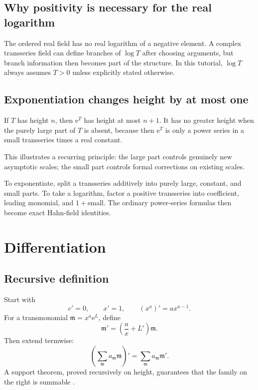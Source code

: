 \documentclass[11pt,oneside]{book}
\theoremstyle{definition}
\theoremstyle{remark}
\newcommand{\m}{\mathfrak{m}}
\newcommand{\e}{\mathrm{e}}
\begin{document}
\section{Why positivity is necessary for the real logarithm}

The ordered real field has no real logarithm of a negative element. A complex
transseries field can define branches of $\log T$ after choosing arguments, but
branch information then becomes part of the structure. In this tutorial,
$\log T$ always assumes $T>0$ unless explicitly stated otherwise.

\section{Exponentiation changes height by at most one}

If $T$ has height $n$, then $\e^T$ has height at most $n+1$. It has no greater
height when the purely large part of $T$ is absent, because then $\e^T$ is only
a power series in a small transseries times a real constant.

This illustrates a recurring principle: the large part controls genuinely new
asymptotic scales; the small part controls formal corrections on existing scales.

\begin{summarybox}
To exponentiate, split a transseries additively into purely large, constant, and
small parts. To take a logarithm, factor a positive transseries into coefficient,
leading monomial, and $1+$small. The ordinary power-series formulas then become
exact Hahn-field identities.
\end{summarybox}

\chapter{Differentiation}
\label{ch:differentiation}

\section{Recursive definition}

Start with
\[
  c'=0,\qquad x'=1,\qquad (x^a)'=ax^{a-1}.
\]
For a transmonomial $\m=x^a\e^L$, define
\begin{equation}
  \m'=\left(\frac{a}{x}+L'\right)\m.
  \label{eq:monomial-derivative}
\end{equation}
Then extend termwise:
\begin{equation}
  \left(\sum_{\m}a_{\m}\m\right)'
  =\sum_{\m}a_{\m}\m'.
  \label{eq:termwise-derivative}
\end{equation}
A support theorem, proved recursively on height, guarantees that the family on
the right is summable \cite{EdgarBeginners,vanDerHoevenBook}.
\end{document}

